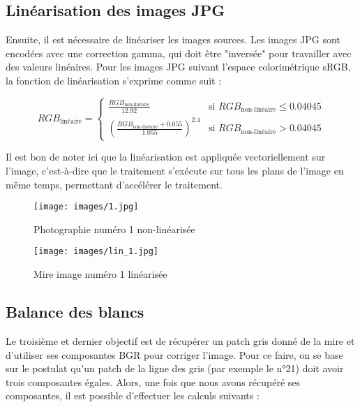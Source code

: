 \documentclass[12pt]{article}
\begin{document}
\subsection{Linéarisation des images JPG}

Ensuite, il est nécessaire de linéariser les images sources. Les images JPG sont encodées avec une correction gamma, qui doit être "inversée" pour travailler avec des valeurs linéaires. Pour les images JPG suivant l'espace colorimétrique sRGB, la fonction de linéarisation s'exprime comme suit :

\begin{equation}
RGB_{\text{linéaire}} = 
\begin{cases} 
\frac{RGB_{\text{non-linéaire}}}{12.92} & \text{si } RGB_{\text{non-linéaire}} \leq 0.04045 \\ 
\left(\frac{RGB_{\text{non-linéaire}} + 0.055}{1.055}\right)^{2.4} & \text{si } RGB_{\text{non-linéaire}} > 0.04045
\end{cases}
\end{equation}

Il est bon de noter ici que la linéarisation est appliquée vectoriellement sur l'image, c'est-à-dire que le traitement s'exécute sur tous les plans de l'image en même temps, permettant d'accélérer le traitement.

\begin{figure}[H]
    \centering
    \begin{minipage}{0.48\textwidth}
        \centering
        \texttt{[image: images/1.jpg]}
        \caption{Photographie numéro 1 non-linéarisée}
    \end{minipage}
    \hfill
    \begin{minipage}{0.48\textwidth}
        \centering
        \texttt{[image: images/lin\_1.jpg]}
        \caption{Mire image numéro 1 linéarisée}
    \end{minipage}
\end{figure}

\subsection{Balance des blancs}
\label{sec:balance_des_blancs}

Le troisième et dernier objectif est de récupérer un patch gris donné de la mire et d'utiliser ses composantes BGR pour corriger l'image.
Pour ce faire, on se base sur le postulat qu'un patch de la ligne des gris (par exemple le n°21) doit avoir trois composantes égales.
Alors, une fois que nous avons récupéré ses composantes, il est possible d'effectuer les calculs suivants :
\end{document}
